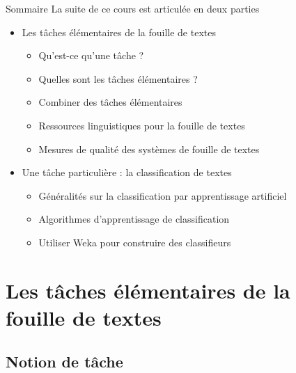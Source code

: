 \documentclass[xcolor={svgnames}, french]{beamer}
\begin{document}
\begin{frame}{Sommaire}
	La suite de ce cours est articulée en deux parties
	\begin{itemize}
		\item Les \alert{tâches élémentaires} de la fouille de textes
			 \begin{itemize}
				 \item Qu'est-ce qu'une tâche ?
				 \item Quelles sont les tâches élémentaires ?
				 \item Combiner des tâches élémentaires
				 \item Ressources linguistiques pour la fouille de textes
				 \item Mesures de qualité des systèmes de fouille de textes
			 \end{itemize}
		\item Une tâche particulière : la \alert{classification} de textes
			\begin{itemize}
				\item Généralités sur la classification par apprentissage artificiel
				\item Algorithmes d'apprentissage de classification
				\item Utiliser Weka pour construire des classifieurs
			\end{itemize}
	\end{itemize}
\end{frame}


\section{Les tâches élémentaires de la fouille de textes}

\subsection{Notion de tâche}
\end{document}
